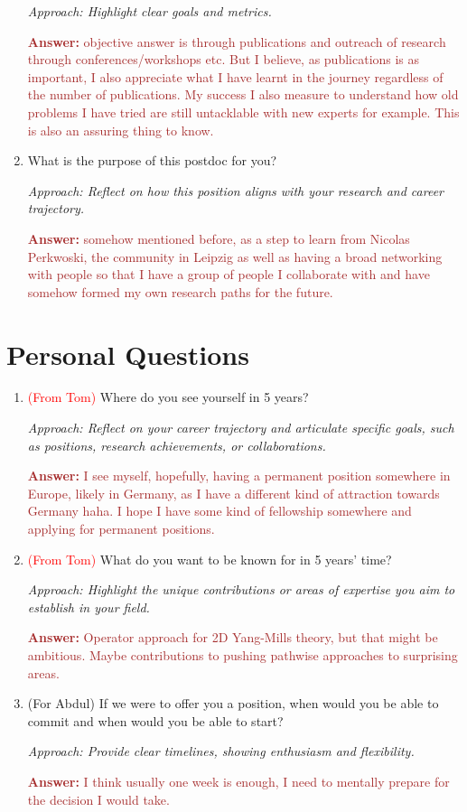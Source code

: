 \documentclass[12pt]{article}
\numberwithin{equation}{section}
\newcommand{\brown}[1]{\textcolor{brown}{#1}}
\newcommand{\red}[1]{\textcolor{red}{#1}}
\newcommand{\blue}[1]{\textcolor{blueblue}{#1}}
\begin{document}
\begin{enumerate}
    \textit{Approach: Highlight clear goals and metrics.}

    \brown{\textbf{Answer:} objective answer is through publications and outreach of research through conferences/workshops etc. But I believe, as publications is as important, I also appreciate what I have learnt in the journey regardless of the number of publications. My success I also measure to understand how old problems I have tried are still untacklable with new experts for example. This is also an assuring thing to know.}
   

    \item What is the purpose of this postdoc for you?
    
    \textit{Approach: Reflect on how this position aligns with your research and career trajectory.}

    \brown{\textbf{Answer:} somehow mentioned before, as a step to learn from Nicolas Perkwoski, the community in Leipzig as well as having a broad networking with people so that I have a group of people I collaborate with and have somehow formed my own research paths for the future.}
\end{enumerate}


\section{Personal Questions}
\begin{enumerate}
    \item \red{(From Tom)} Where do you see yourself in 5 years?
    
    \textit{Approach: Reflect on your career trajectory and articulate specific goals, such as positions, research achievements, or collaborations.}

    \brown{\textbf{Answer:} I see myself, hopefully, having a permanent position somewhere in Europe, likely in Germany, as I have a different kind of attraction towards Germany haha. I hope I have some kind of fellowship somewhere and applying for permanent positions. }

    \item \red{(From Tom)} What do you want to be known for in 5 years' time?
    
    \textit{Approach: Highlight the unique contributions or areas of expertise you aim to establish in your field.}

    \brown{\textbf{Answer:} Operator approach for 2D Yang-Mills theory, but that might be ambitious. Maybe contributions to pushing pathwise approaches to surprising areas. }

    



    \item \blue{(For Abdul)} If we were to offer you a position, when would you be able to commit and when would you be able to start?
    
    \textit{Approach: Provide clear timelines, showing enthusiasm and flexibility.}

    \brown{\textbf{Answer:} I think usually one week is enough, I need to mentally prepare for the decision I would take.}
\end{enumerate}
\end{document}
